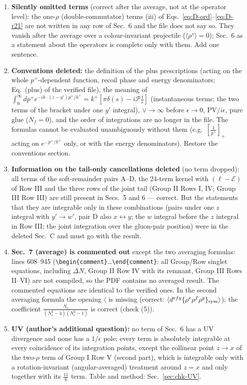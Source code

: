 \documentclass[9pt]{article}
\numberwithin{equation}{section}
\begin{document}
{\begin{enumerate}
\item \textbf{Silently omitted terms} (correct after the average, not at the operator level): the one-$\rho$ (double-commutator) terms (iii) of Eqs.~\eqref{eq:D-ord}--\eqref{eq:D-r21} are not written in any row of Sec.~6 and the file does not say so. They vanish after the average over a colour-invariant projectile ($\langle\rho^{s}\rangle=0$); Sec.~6 as a statement about the operators is complete only with them. Add one sentence.
\item \textbf{Conventions deleted:} the definition of the plus prescriptions (acting on the whole $p^{+}$-dependent function, recoil phase and energy denominators; Eq.~(plus) of the verified file), the meaning of $\int_{0}^{\infty}dp^{+}e^{-ik\cdot(z-y')p^{+}/k^{+}}=k^{+}[\pi\delta(s)-i\mathcal P\frac1s]$ (instantaneous terms; the two terms of the bracket under one $y'$ integral), $\vee\to\infty$ before $\epsilon\to0$, PV/$i\epsilon$, pure glue ($N_f=0$), and the order of integrations are no longer in the file. The formulas cannot be evaluated unambiguously without them (e.g.\ $[\frac{1}{p^{+}}]_{+}$ acting on $e^{\dots p^{+}/k^{+}}$ only, or with the energy denominators). Restore the conventions section.
\item \textbf{Information on the tail-only cancellations deleted} (no term dropped): all terms of the soft-remainder pairs A--D, the 24-term kernel with $(\ell-\mathcal E)$ of Row III and the three rows of the joint tail (Group II Rows I, IV; Group III Row III) are still present in Secs.~5 and 6 --- correct. But the statements that they are integrable only in these combinations (pairs under one $z$ integral with $y'\to w'$, pair D also $x\leftrightarrow y$; the $w$ integral before the $z$ integral in Row III; the joint integration over the gluon-pair position) were in the deleted Sec.~C and must go with the result.
\item \textbf{Sec.~7 (average) is commented out} except the two averaging formulas: lines 608--945 (\texttt{\textbackslash begin\{comment\}}\dots\texttt{\textbackslash end\{comment\}}: all Group/Row singlet equations, including $\Delta N$, Group II Row IV with its remnant, Group III Rows II--VI) are not compiled, so the PDF contains no averaged result. The commented equations are identical to the verified ones. In the second averaging formula the opening $\langle$ is missing (correct: $\langle d^{efg}\{\rho^e\rho^f\rho^g\}_{\rm sym}\rangle$); the coefficient $\frac{N_c}{(N_c^2-4)(N_c^2-1)}$ is correct (check (5)).
\item \textbf{UV (author's additional question):} no term of Sec.~6 has a UV divergence and none has a $1/\epsilon$ pole; every term is absolutely integrable at every coincidence of its integration points, except the collinear point $z\to x$ of the two-$\rho$ term of Group I Row V (second part), which is integrable only with a rotation-invariant (angular-averaged) treatment around $z=x$ and only together with its $\frac{11}{6}$ term. Table and method: Sec.~\ref{sec:chk-UV}.

\end{enumerate}}
\end{document}
